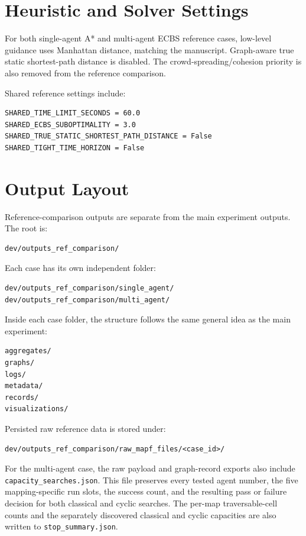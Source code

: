 \documentclass[11pt]{article}
\begin{document}
\section{Heuristic and Solver Settings}

For both single-agent A* and multi-agent ECBS reference cases, low-level guidance uses Manhattan distance, matching the manuscript. Graph-aware true static shortest-path distance is disabled. The crowd-spreading/cohesion priority is also removed from the reference comparison.

Shared reference settings include:

\begin{lstlisting}
SHARED_TIME_LIMIT_SECONDS = 60.0
SHARED_ECBS_SUBOPTIMALITY = 3.0
SHARED_TRUE_STATIC_SHORTEST_PATH_DISTANCE = False
SHARED_TIGHT_TIME_HORIZON = False
\end{lstlisting}

\section{Output Layout}

Reference-comparison outputs are separate from the main experiment outputs. The root is:

\begin{lstlisting}
dev/outputs_ref_comparison/
\end{lstlisting}

Each case has its own independent folder:

\begin{lstlisting}
dev/outputs_ref_comparison/single_agent/
dev/outputs_ref_comparison/multi_agent/
\end{lstlisting}

Inside each case folder, the structure follows the same general idea as the main experiment:

\begin{lstlisting}
aggregates/
graphs/
logs/
metadata/
records/
visualizations/
\end{lstlisting}

Persisted raw reference data is stored under:

\begin{lstlisting}
dev/outputs_ref_comparison/raw_mapf_files/<case_id>/
\end{lstlisting}

For the multi-agent case, the raw payload and graph-record exports also include \texttt{capacity\_searches.json}. This file preserves every tested agent number, the five mapping-specific run slots, the success count, and the resulting pass or failure decision for both classical and cyclic searches. The per-map traversable-cell counts and the separately discovered classical and cyclic capacities are also written to \texttt{stop\_summary.json}.
\end{document}
